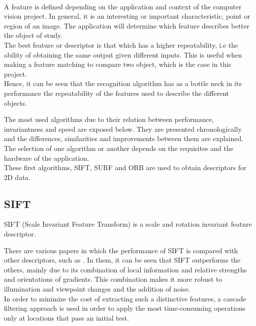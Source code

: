 \\
A feature is defined depending on the application and context of the computer vision project. In general, it is an interesting or important characteristic, point or region of an image. The application will determine which feature describes better the object of study. 
\\

The best feature or descriptor is that which has a higher repeatability, i.e the ability of obtaining the same output given different inputs. This is useful when making a feature matching to compare two object, which is the case in this project. 
\\

Hence, it can be seen that the recognition algorithm has as a bottle neck in its performance the repeatability of the features used to describe the different objects. 

The most used algorithms due to their relation between performance, invariantness and speed are exposed below. They are presented chronologically and the differences, similarities and improvements between them are explained. 
\\

The selection of one algorithm or another depends on the requisites and the hardware of the application.
\\

These first algorithms, SIFT, SURF and ORB are used to obtain descriptors for 2D data. 

\subsection{SIFT}

SIFT (Scale Invariant Feature Transform) is a scale and rotation invariant feature descriptor\cite{sift}. 

There are various papers in which the performance of SIFT is compared with other descriptors, such as \cite{Mikolajczyk2005}. In them, it can be seen that SIFT outperforms the others, mainly due to its combination of local information and relative strengths and orientations of gradients. This combination makes it more robust to illumination and viewpoint changes and the addition of noise. 
\\

In order to minimize the cost of extracting such a distinctive features, a cascade filtering approach is used in order to apply the most time-consuming operations only at locations that pass an initial test. 
\\

